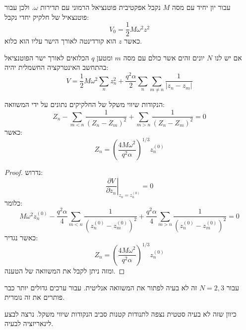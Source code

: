 \documentclass{tstextbook}
\begin{document}
\begin{proposition}
עבור יון יחיד עם מסה \(M\) נקבל אפקטיבית פוטנציאל הרמוני עם תדירות \(\omega\). ולכן עבור פוטנצאיל של חלקיק יחדי נקבל:
$$V_{0}=\frac{1}{2}M\omega^{2}z^{2}$$
כאשר \(z\) הוא קורדינטה לאורך הישר עליו הוא כלוא.

\end{proposition}
\begin{proposition}
אם יש לנו \(N\) יונים זהים אשר כולם עם מסה \(m\) ומטען \(q\) הכלואים לאורך ישר הפוטנציאל בהתחשב האינטרקציה החשמלית יהיה:
$$V=\frac{1}{2}M\omega^{2}{\sum_{n}}z_{n}^{2}+\frac{q^{2}\alpha}{2}{\sum_{n}}{\sum_{m\neq n}}\frac{1}{|z_{n}-z_{m}|}$$

\end{proposition}
\begin{proposition}
הנקודות שיווי משקל של החלקיקים נתונים על ידי המשוואה:
$$Z_{n}-\sum_{m<n}\frac{1}{(Z_{n}-Z_{m})^{2}}+\sum_{m>n}\frac{1}{(Z_{n}-Z_{m})^{2}}=0$$
כאשר:
$$Z_{n}=\left(\frac{4M\omega^{2}}{q^{2}\alpha}\right)^{1/3}z_{n}^{(0)}$$

\end{proposition}
\begin{proof}
נדרוש:
$$\left.\frac{\partial V}{\partial z_{n}}\right|_{z_{n}=z_{n}^{(0)}}=0$$
כלומר:
$$M\omega^{2}z_{n}^{(0)}-\frac{q^{2}\alpha}{4}\sum_{m<n}\frac{1}{\left(z_{n}^{(0)}-z_{m}^{(0)}\right)^{2}}+\frac{q^{2}\alpha}{4}\sum_{m>n}\frac{1}{\left(z_{n}^{(0)}-z_{m}^{(0)}\right)^{2}}=0$$
כאשר נגדיר:
$$Z_{n}=\left(\frac{4M\omega^{2}}{q^{2}\alpha}\right)^{1/3}z_{n}^{(0)}$$
ומזה ניתן לקבל את המשוואה של הטענה.

\end{proof}
\begin{remark}
עבור \(N=2,3\) זה לא בעיה לפתור את המשוואה אנליטית. עבור ערכים גדולים יותר כבר פותרים את זה נומרית.

\end{remark}
כיוון שזה לא בעיה סטטית נצפה לתנודות קטנות סביב הנקודות שיווי משקל. נרצה לבצע לינאריזציה לבעיה.
\end{document}
